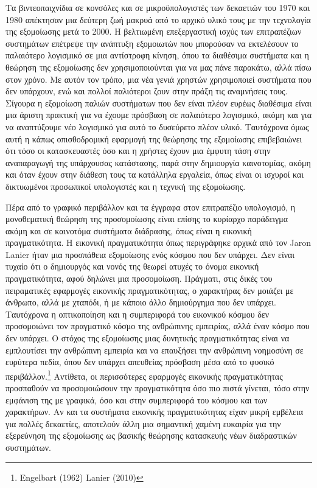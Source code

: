 \documentclass[
]{article}
\begin{document}
Τα βιντεοπαιχνίδια σε κονσόλες και σε μικροϋπολογιστές των δεκαετιών του
1970 και 1980 απέκτησαν μια δεύτερη ζωή μακρυά από το αρχικό υλικό τους
με την τεχνολογία της εξομοίωσης μετά το 2000. Η βελτιωμένη
επεξεργαστική ισχύς των επιτραπέζιων συστημάτων επέτρεψε την ανάπτυξη
εξομοιωτών που μπορούσαν να εκτελέσουν το παλαιότερο λογισμικό σε μια
αντίστροφη κίνηση, όπου τα διαθέσιμα συστήματα και η θεώρηση της
εξομοίωσης δεν χρησιμοποιούνται για να μας πάνε παρακάτω, αλλά πίσω στον
χρόνο. Με αυτόν τον τρόπο, μια νέα γενιά χρηστών χρησιμοποιεί συστήματα
που δεν υπάρχουν, ενώ και πολλοί παλιότεροι ζουν στην πράξη τις
αναμνήσεις τους. Σίγουρα η εξομοίωση παλιών συστήματων που δεν είναι
πλέον ευρέως διαθέσιμα είναι μια άριστη πρακτική για να έχουμε πρόσβαση
σε παλαιότερο λογισμικό, ακόμη και για να αναπτύξουμε νέο λογισμικό για
αυτό το δυσεύρετο πλέον υλικό. Ταυτόχρονα όμως αυτή η κάπως
οπισθοδρομική εφαρμογή της θεώρησης της εξομοίωσης επιβεβαιώνει ότι τόσο
οι κατασκευαστές όσο και η χρήστες έχουν μια έμφυτη τάση στην
αναπαραγωγή της υπάρχουσας κατάστασης, παρά στην δημιουργία καινοτομίας,
ακόμη και όταν έχουν στην διάθεση τους τα κατάλληλα εργαλεία, όπως είναι
οι ισχυροί και δικτυωμένοι προσωπικοί υπολογιστές και η τεχνική της
εξομοίωσης.

Πέρα από το γραφικό περιβάλλον και τα έγγραφα στον επιτραπέζιο
υπολογισμό, η μονοθεματική θεώρηση της προσομοίωσης είναι επίσης το
κυρίαρχο παράδειγμα ακόμη και σε καινοτόμα συστήματα διάδρασης, όπως
είναι η εικονική πραγματικότητα. Η εικονική πραγματικότητα όπως
περιγράφηκε αρχικά από τον Jaron Lanier ήταν μια προσπάθεια εξομοίωσης
ενός κόσμου που δεν υπάρχει. Δεν είναι τυχαίο ότι ο δημιουργός και νονός
της θεωρεί ατυχές το όνομα εικονική πραγματικότητα, αφού δηλώνει μια
προσομοίωση. Πράγματι, στις δικές του πειραματικές εφαρμογές εικονικής
πραγματικότητας, ο χαρακτήρας δεν μοιάζει με άνθρωπο, αλλά με χταπόδι, ή
με κάποιο άλλο δημιούργημα που δεν υπάρχει. Ταυτόχρονα η οπτικοποίηση
και η συμπεριφορά του εικονικού κόσμου δεν προσομοιώνει τον πραγματικό
κόσμο της ανθρώπινης εμπειρίας, αλλά έναν κόσμο που δεν υπάρχει. Ο
στόχος της εξομοίωσης μιας δυνητικής πραγματικότητας είναι να
εμπλουτίσει την ανθρώπινη εμπειρία και να επαυξήσει την ανθρώπινη
νοημοσύνη σε ευρύτερα πεδία, όπου δεν υπάρχει απευθείας πρόσβαση μέσα
από το φυσικό περιβάλλον.\footnote{Engelbart (1962) Lanier (2010)}
Αντίθετα, οι περισσότερες εφαρμογές εικονικής πραγματικότητας προσπαθούν
να προσομοιώσουν την πραγματικότητα όσο πιο πιστά γίνεται, τόσο στην
εμφάνιση της με γραφικά, όσο και στην συμπεριφορά του κόσμου και των
χαρακτήρων. Αν και τα συστήματα εικονικής πραγματικότητας είχαν μικρή
εμβέλεια για πολλές δεκαετίες, αποτελούν άλλη μια σημαντική χαμένη
ευκαιρία για την εξερεύνηση της εξομοίωσης ως βασικής θεώρησης
κατασκευής νέων διαδραστικών συστημάτων.
\end{document}
